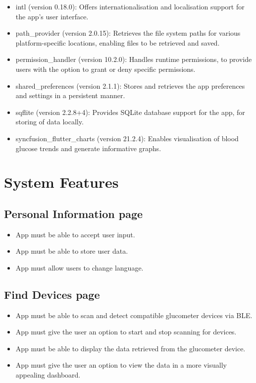 \documentclass[a4paper]{scrreprt}
\begin{document}
\begin{itemize}
\begin{itemize}
        \item intl (version 0.18.0): Offers internationalisation and localisation support for the app's user interface.
        \item path\_provider (version 2.0.15): Retrieves the file system paths for various platform-specific locations, enabling files to be retrieved and saved.
        \item permission\_handler (version 10.2.0): Handles runtime permissions, to provide users with the option to grant or deny specific permissions.
        \item shared\_preferences (version 2.1.1): Stores and retrieves the app preferences and settings in a persistent manner.
        \item sqflite (version 2.2.8+4): Provides SQLite database support for the app, for storing of data locally.
        \item syncfusion\_flutter\_charts (version 21.2.4): Enables visualisation of blood glucose trends and generate informative graphs.
    \end{itemize}
\end{itemize}

\chapter{System Features}

\section{Personal Information page}
\begin{itemize}
    \item App must be able to accept user input.
    \item App must be able to store user data.
    \item App must allow users to change language.
\end{itemize}
\section{Find Devices page}
\begin{itemize}
    \item App must be able to scan and detect compatible glucometer devices via BLE.
    \item App must give the user an option to start and stop scanning for devices.
    \item App must be able to display the data retrieved from the glucometer device.
    \item App must give the user an option to view the data in a more visually appealing dashboard.
\end{itemize}
\end{document}
